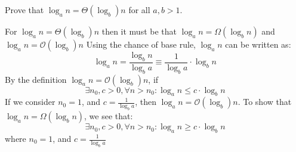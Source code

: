 Prove that  $\log_{a} n = \Theta (\log_{b}) n$ for all $a, b > 1$.
\begin{customsolutionbox}
    For $\log_{a} n = \Theta (\log_{b}) n$ then it must be that $\log_{a} n = \Omega (\log_{b} n)$ and $\log_{a} n = \mathcal{O} (\log_{b}) n$
    Using the chance of base rule, $\log_{a}n$ can be written as:
    \[\log_{a}n = \frac{\log_{b}n}{\log_{b}a} \equiv \frac{1}{\log_{b}a} \cdot \log_{b}n\]
    By the definition $\log_{a} n = \mathcal{O} (\log_{b}) n$, if \[\exists n_0, c > 0, \forall n > n_0: \log_{a}n\leq c \cdot \log_{b}n\]
    If we consider $n_0 = 1$, and $c = \frac{1}{\log_{b}a}$, then $\log_{a} n = \mathcal{O} (\log_{b}) n$. To show that $\log_{a} n = \Omega (\log_{b} n)$, we see that:
    \[\exists n_0, c > 0, \forall n > n_0: \log_{a}n \geq c \cdot \log_{b}n\]where $n_0 = 1$, and $c = \frac{1}{\log_{b}a}$
\end{customsolutionbox}
